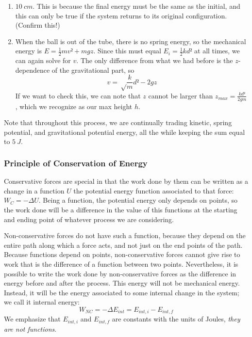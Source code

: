 \begin{enumerate}
$$
v² + 2gd = \frac km d² 
\quad \quad ⇒ \quad \quad
v = √{\frac km d² - 2gd}
$$
Plugging in numbers, this gives $v ≈ 9.9\ m/s$.
\item $10\ cm$. This is because the final energy must be the same as the initial, and this can only be true if the system returns to its original configuration. (Confirm this!)
\item When the ball is out of the tube, there is no spring energy, so the mechanical energy is $E=\frac12 mv² + mgz$. Since this must equal $E_i = \frac12 k d²$ at all times, we can again solve for $v$. The only difference from what we had before is the $z$-dependence of the gravitational part, so 
$$
v = √{\frac km d² - 2gz}
$$
If we want to check this, we can note that $z$ cannot be larger than $z_{max} = \frac {kd²}{2gm} $, which we recognize as our max height $h$.
\end{enumerate}
Note that throughout this process, we are continually trading kinetic, spring potential, and gravitational potential energy, all the while keeping the sum equal to $5\ J$. 

\subsubsection{Principle of Conservation of Energy}

Conservative forces are special in that the work done by them can be written as a change in a function $U$ the potential energy function associated to that force: $W_C = -ΔU$. 
Being a function, the potential energy only depends on points, so the work done will be a difference in the value of this functions at the starting and ending point of whatever process we are considering. 

Non-conservative forces do not have such a function, because they depend on the entire path along which a force acts, and not just on the end points of the path. Because functions depend on points, non-conservative forces cannot give rise to work that is the difference of a function between two points. Nevertheless, it is possible to write the work done by non-conservative forces as the difference in energy before and after the process. This energy will not be mechanical energy. Instead, it will be the energy associated to some internal change in the system; we call it internal energy:
$$
W_{NC} = -ΔE_{int} = E_{int, i} - E_{int, f}
$$
We emphasize that $E_{int, i}$ and $E_{int, f}$ are constants with the units of Joules, {\em they are not functions}. 

